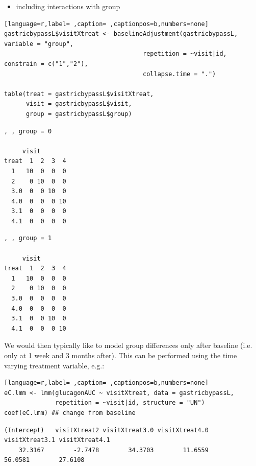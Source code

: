 \documentclass[12pt]{article}
\begin{document}
\begin{itemize}
\item including interactions with group
\end{itemize}
\begin{lstlisting}[language=r,label= ,caption= ,captionpos=b,numbers=none]
gastricbypassL$visitXtreat <- baselineAdjustment(gastricbypassL, variable = "group",
                                      repetition = ~visit|id, constrain = c("1","2"),
                                      collapse.time = ".")

table(treat = gastricbypassL$visitXtreat,
      visit = gastricbypassL$visit,
      group = gastricbypassL$group)
\end{lstlisting}

\begin{minipage}{0.45\linewidth}
\begin{verbatim}
, , group = 0

     visit
treat  1  2  3  4
  1   10  0  0  0
  2    0 10  0  0
  3.0  0  0 10  0
  4.0  0  0  0 10
  3.1  0  0  0  0
  4.1  0  0  0  0
\end{verbatim}
\end{minipage}
\begin{minipage}{0.05\linewidth}
\hphantom{x}
\end{minipage}
\begin{minipage}{0.45\linewidth}
\begin{verbatim}
, , group = 1

     visit
treat  1  2  3  4
  1   10  0  0  0
  2    0 10  0  0
  3.0  0  0  0  0
  4.0  0  0  0  0
  3.1  0  0 10  0
  4.1  0  0  0 10
\end{verbatim}

\end{minipage}

We would then typically like to model group differences only after
baseline (i.e. only at 1 week and 3 months after). This can be
performed using the time varying treatment variable, e.g.:
\begin{lstlisting}[language=r,label= ,caption= ,captionpos=b,numbers=none]
eC.lmm <- lmm(glucagonAUC ~ visitXtreat, data = gastricbypassL,
              repetition = ~visit|id, structure = "UN")
coef(eC.lmm) ## change from baseline
\end{lstlisting}

\begin{verbatim}
(Intercept)   visitXtreat2 visitXtreat3.0 visitXtreat4.0 visitXtreat3.1 visitXtreat4.1 
    32.3167        -2.7478        34.3703        11.6559        56.0581        27.6108
\end{verbatim}
\end{document}
